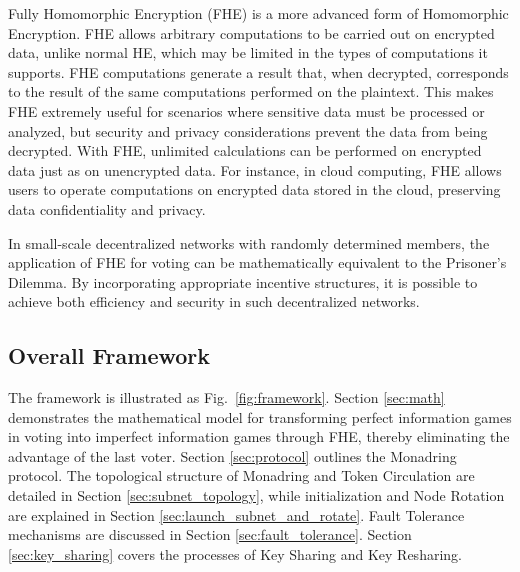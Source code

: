 \documentclass[11pt]{article}
\begin{document}
Fully Homomorphic Encryption (FHE)\cite{chillotti2020tfhe} is a more advanced form of Homomorphic Encryption. FHE allows arbitrary computations to be carried out on encrypted data, unlike normal HE, which may be limited in the types of computations it supports. FHE computations generate a result that, when decrypted, corresponds to the result of the same computations performed on the plaintext. This makes FHE extremely useful for scenarios where sensitive data must be processed or analyzed, but security and privacy considerations prevent the data from being decrypted. With FHE, unlimited calculations can be performed on encrypted data just as on unencrypted data. For instance, in cloud computing, FHE allows users to operate computations on encrypted data stored in the cloud, preserving data confidentiality and privacy.

In small-scale decentralized networks with randomly determined members, the application of FHE for voting can be mathematically equivalent to the Prisoner’s Dilemma. By incorporating appropriate incentive structures, it is possible to achieve both efficiency and security in such decentralized networks.

\subsection{Overall Framework}
The framework is illustrated as Fig.~\ref{fig:framework}.
Section \ref{sec:math} demonstrates the mathematical model for transforming perfect information games in voting into imperfect information games through FHE, thereby eliminating the advantage of the last voter. Section \ref{sec:protocol} outlines the Monadring protocol. The topological structure of Monadring and Token Circulation are detailed in Section \ref{sec:subnet_topology}, while initialization and Node Rotation are explained in Section \ref{sec:launch_subnet_and_rotate}. Fault Tolerance mechanisms are discussed in Section \ref{sec:fault_tolerance}.  Section \ref{sec:key_sharing} covers the processes of Key Sharing and Key Resharing.
\end{document}
